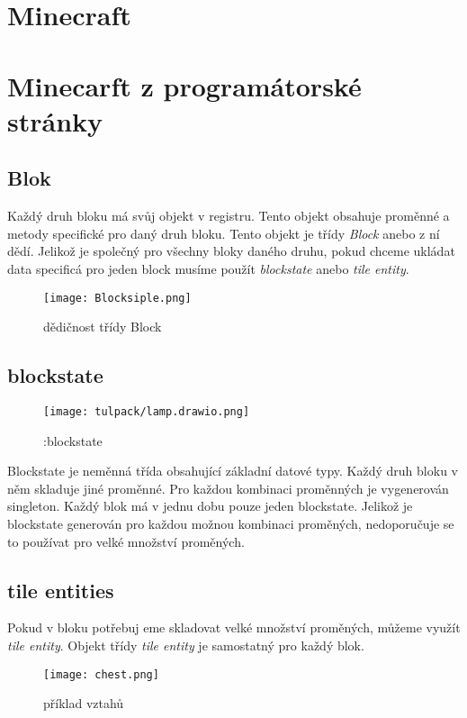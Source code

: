 \documentclass[FM,RP]{tulthesis}
\begin{document}


\chapter{Minecraft}

\chapter{Minecarft z programátorské stránky}
\section{Blok}
Každý druh bloku má svůj objekt v registru. Tento objekt obsahuje proměnné a metody specifické pro daný druh bloku. Tento objekt je třídy \textit{Block} anebo z ní dědí. Jelikož je společný pro všechny bloky daného druhu, pokud chceme ukládat data specificá pro jeden block musíme použít \textit{blockstate} anebo \textit{tile entity}.
\begin{figure}[h]
    \centering
    \texttt{[image: Blocksiple.png]}
    \caption{dědičnost třídy Block}
    \label{fig:enter-label}
\end{figure}

\section{blockstate}

\begin{figure}[h]
    \centering
    \texttt{[image: tulpack/lamp.drawio.png]}
    \caption{:blockstate}
    \label{fig:blockstate}
\end{figure}
Blockstate je neměnná třída obsahující základní datové typy. Každý druh bloku v něm skladuje jiné proměnné. Pro každou kombinaci proměnných je vygenerován singleton. Každý blok má v jednu dobu pouze jeden blockstate. Jelikož je blockstate generován pro každou možnou kombinaci proměných, nedoporučuje se to používat pro velké množství proměných.


\section{tile entities}
Pokud v bloku potřebuj eme skladovat velké množství proměných, můžeme využít \textit{tile entity}. Objekt třídy \textit{tile entity} je samostatný pro každý blok.
\begin{figure}[h]
    \centering
    \texttt{[image: chest.png]}
    \caption{příklad vztahů}
    \label{fig:enter-label}
\end{figure}
\end{document}
